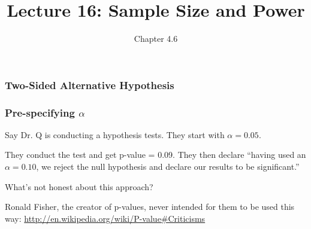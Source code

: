 \documentclass[handout]{beamer}
\title{Lecture 16: Sample Size and Power}
\author{Chapter 4.6}
\date{}
\newcommand{\blue}[1]{\textcolor{blue2}{#1}}
\begin{document}
\begin{frame}
\titlepage
\end{frame}


\begin{frame}
\frametitle{Two-Sided Alternative Hypothesis}

%
%
%
%
%

\end{frame}


\begin{frame}[fragile]
\frametitle{Pre-specifying $\alpha$}

Say Dr. Q is conducting a hypothesis tests.  They start with $\alpha=0.05$.

\pause\vspace{0.5cm}

They conduct the test and get \blue{p-value = 0.09}.  They then declare ``having used an \blue{$\alpha=0.10$}, we reject the null hypothesis and declare our results to be significant.''

\pause\vspace{0.5cm}
What's not honest about this approach?

\pause\vspace{0.5cm}
Ronald Fisher, the creator of p-values, never intended for them to be used this way:  \blue{\href{http://en.wikipedia.org/wiki/P-value\#Criticisms}{http://en.wikipedia.org/wiki/P-value\#Criticisms}}

\end{frame}
\end{document}
